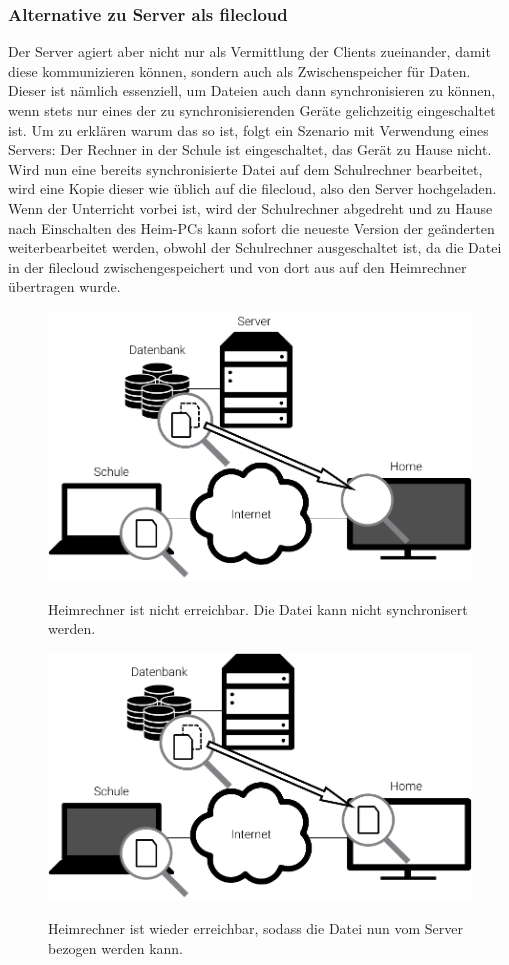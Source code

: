 \subsubsection{Alternative zu Server als \gls{filecloud}}
Der Server agiert aber nicht nur als Vermittlung der Clients zueinander, damit diese
kommunizieren können, sondern auch als Zwischenspeicher für Daten. Dieser ist nämlich
essenziell, um Dateien auch dann synchronisieren zu können, wenn stets nur eines der
zu synchronisierenden Geräte gelichzeitig eingeschaltet ist. Um zu erklären warum das
so ist, folgt ein Szenario mit Verwendung eines Servers:
Der Rechner in der Schule ist eingeschaltet, das Gerät zu Hause nicht. Wird nun
eine bereits synchronisierte Datei auf dem Schulrechner bearbeitet, wird eine Kopie dieser wie
üblich auf die \gls{filecloud}, also den Server hochgeladen. Wenn der Unterricht vorbei ist,
wird der Schulrechner abgedreht und zu Hause nach Einschalten des Heim-PCs kann sofort die neueste Version der
geänderten weiterbearbeitet werden, obwohl der Schulrechner ausgeschaltet ist, da die Datei in der \gls{filecloud}
zwischengespeichert und von dort aus auf den Heimrechner übertragen wurde.
\begin{figure}[htb]
	\centering
  \includegraphics[]{images/dropbox_temp_1}
	\label{dropbox_temp_1}
  \caption{Heimrechner ist nicht erreichbar. Die Datei kann nicht synchronisert werden.}
\end{figure}

\begin{figure}[htb]
	\centering
  \includegraphics[]{images/dropbox_temp_2}
	\label{dropbox_temp_2}
  \caption{Heimrechner ist wieder erreichbar, sodass die Datei nun vom Server
	bezogen werden kann.}
\end{figure}

